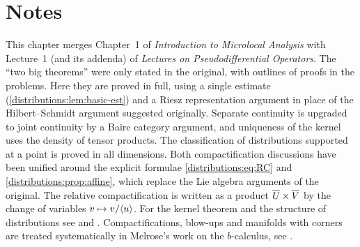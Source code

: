 \section*{Notes}
This chapter merges Chapter~1 of \emph{Introduction to Microlocal Analysis} with Lecture~1
(and its addenda) of \emph{Lectures on Pseudodifferential Operators}. The ``two big
theorems'' were only stated in the original, with outlines of proofs in the problems.
Here they are proved in full, using a single estimate
(\cref{distributions:lem:basic-est}) and a Riesz representation argument in place of
the Hilbert--Schmidt argument suggested originally. Separate continuity is upgraded to
joint continuity by a Baire category argument, and uniqueness of the kernel uses the
density of tensor products. The classification of distributions supported at a point
is proved in all dimensions. Both compactification discussions have been unified around
the explicit formulae \eqref{distributions:eq:RC} and
\cref{distributions:prop:affine}, which replace the Lie algebra arguments of the
original. The relative compactification is written as a product
$\overline{U}\times\overline{V}$ by the change of variables $v\mapsto v/\langle u\rangle$. For the
kernel theorem and the structure of distributions see \cite[Chapter~5 and
\S7.1]{Hormander-I} and \cite{Friedlander}. Compactifications, blow-ups and manifolds
with corners are treated systematically in Melrose's work on the $b$-calculus, see
\cite{Melrose-APS}.
